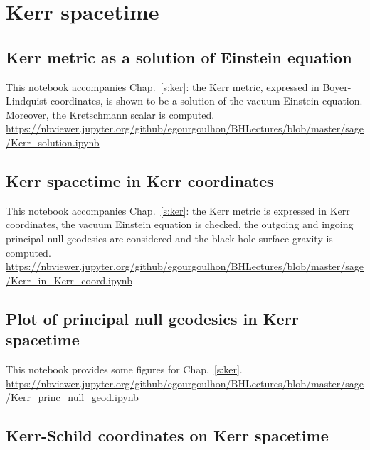 
\section{Kerr spacetime}

\subsection{Kerr metric as a solution of Einstein equation} \label{s:sam:Kerr_solution}

This notebook accompanies Chap.~\ref{s:ker}: the Kerr metric, expressed in Boyer-Lindquist
coordinates, is shown to be a solution of the vacuum Einstein equation. Moreover, the Kretschmann scalar is computed.\\[1ex]
{\footnotesize
\url{https://nbviewer.jupyter.org/github/egourgoulhon/BHLectures/blob/master/sage/Kerr_solution.ipynb}
}

\subsection{Kerr spacetime in Kerr coordinates} \label{s:sam:Kerr_Kerr_coord}

This notebook accompanies Chap.~\ref{s:ker}: the Kerr metric is expressed in Kerr coordinates, the vacuum Einstein equation is checked, the outgoing and ingoing principal null geodesics are considered and the black hole surface gravity is computed.\\[1ex]
{\footnotesize
\url{https://nbviewer.jupyter.org/github/egourgoulhon/BHLectures/blob/master/sage/Kerr_in_Kerr_coord.ipynb}
}

\subsection{Plot of principal null geodesics in Kerr spacetime} \label{s:sam:Kerr_princ_null_geod}

This notebook provides some figures for Chap.~\ref{s:ker}.\\[1ex]
{\footnotesize
\url{https://nbviewer.jupyter.org/github/egourgoulhon/BHLectures/blob/master/sage/Kerr_princ_null_geod.ipynb}
}


\subsection{Kerr-Schild coordinates on Kerr spacetime} \label{s:sam:Kerr_Schild}

